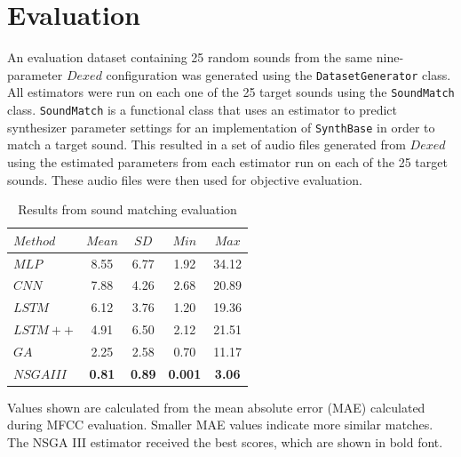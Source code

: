 \section{Evaluation}

An evaluation dataset containing 25 random sounds from the same nine-parameter $Dexed$ configuration was generated using the \texttt{DatasetGenerator} class. All estimators were run on each one of the 25 target sounds using the \texttt{SoundMatch} class. \texttt{SoundMatch} is a functional class that uses an estimator to predict synthesizer parameter settings for an implementation of \texttt{SynthBase} in order to match a target sound. This resulted in a set of audio files generated from $Dexed$ using the estimated parameters from each estimator run on each of the 25 target sounds. These audio files were then used for objective evaluation.

\begin{table}[t]
\centering
\caption{Results from sound matching evaluation}
\label{tbl:sound_match_eval}
\begin{threeparttable}
\begin{tabular}{l|cccc}
\toprule
$Method$ & $Mean$ & $SD$ & $Min$ & $Max$ \\
\midrule
$MLP$ & 8.55 & 6.77 & 1.92 & 34.12 \\
$CNN$ & 7.88 & 4.26 & 2.68 & 20.89 \\
$LSTM$ & 6.12 & 3.76 & 1.20 & 19.36 \\
$LSTM++$ & 4.91 & 6.50 & 2.12 & 21.51 \\
$GA$ & 2.25 & 2.58 & 0.70 & 11.17 \\
$NSGA III$ & \textbf{0.81} & \textbf{0.89} & \textbf{0.001} & \textbf{3.06} \\
\bottomrule
\end{tabular}
\begin{tablenotes}
\footnotesize
\item Values shown are calculated from the mean absolute error (MAE) calculated during MFCC evaluation. Smaller MAE values indicate more similar matches. The NSGA III estimator received the best scores, which are shown in bold font.
\end{tablenotes}
\end{threeparttable}
\end{table}


